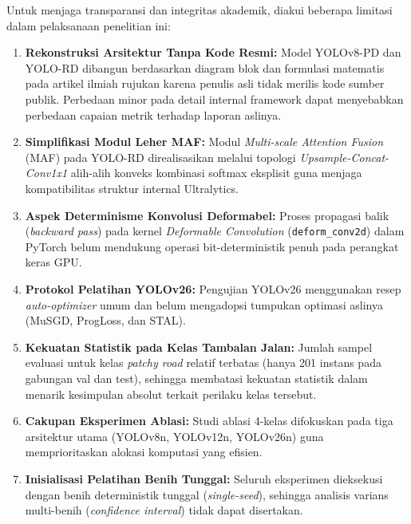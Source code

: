 Untuk menjaga transparansi dan integritas akademik, diakui beberapa limitasi dalam pelaksanaan penelitian ini:
\begin{enumerate}
	\item \textbf{Rekonstruksi Arsitektur Tanpa Kode Resmi:} Model YOLOv8-PD dan YOLO-RD dibangun berdasarkan diagram blok dan formulasi matematis pada artikel ilmiah rujukan karena penulis asli tidak merilis kode sumber publik. Perbedaan minor pada detail internal framework dapat menyebabkan perbedaan capaian metrik terhadap laporan aslinya.
	\item \textbf{Simplifikasi Modul Leher MAF:} Modul \textit{Multi-scale Attention Fusion} (MAF) pada YOLO-RD direalisasikan melalui topologi \textit{Upsample-Concat-Conv1x1} alih-alih konveks kombinasi softmax eksplisit guna menjaga kompatibilitas struktur internal Ultralytics.
	\item \textbf{Aspek Determinisme Konvolusi Deformabel:} Proses propagasi balik (\textit{backward pass}) pada kernel \textit{Deformable Convolution} (\texttt{deform\_conv2d}) dalam PyTorch belum mendukung operasi bit-deterministik penuh pada perangkat keras GPU.
	\item \textbf{Protokol Pelatihan YOLOv26:} Pengujian YOLOv26 menggunakan resep \textit{auto-optimizer} umum dan belum mengadopsi tumpukan optimasi aslinya (MuSGD, ProgLoss, dan STAL).
	\item \textbf{Kekuatan Statistik pada Kelas Tambalan Jalan:} Jumlah sampel evaluasi untuk kelas \textit{patchy road} relatif terbatas (hanya 201 instans pada gabungan val dan test), sehingga membatasi kekuatan statistik dalam menarik kesimpulan absolut terkait perilaku kelas tersebut.
	\item \textbf{Cakupan Eksperimen Ablasi:} Studi ablasi 4-kelas difokuskan pada tiga arsitektur utama (YOLOv8n, YOLOv12n, YOLOv26n) guna memprioritaskan alokasi komputasi yang efisien.
	\item \textbf{Inisialisasi Pelatihan Benih Tunggal:} Seluruh eksperimen dieksekusi dengan benih deterministik tunggal (\textit{single-seed}), sehingga analisis varians multi-benih (\textit{confidence interval}) tidak dapat disertakan.
\end{enumerate}
